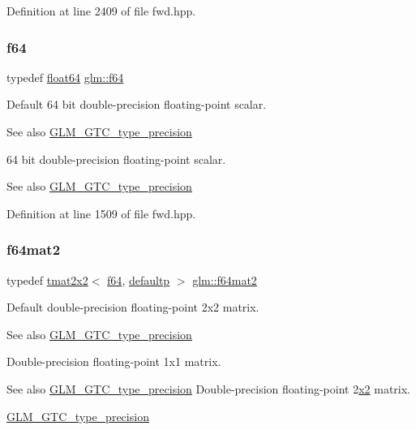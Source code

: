 Definition at line 2409 of file fwd.\+hpp.

\mbox{\label{group__gtc__type__precision_ga2bba392e555124b36cde6abba349bab3}} 
\subsubsection{\texorpdfstring{f64}{f64}}
{\footnotesize\ttfamily typedef \mbox{\hyperlink{group__gtc__type__precision_gab721f828b41f46b20cf4883b50733d3b}{float64}} \mbox{\hyperlink{group__gtc__type__precision_ga2bba392e555124b36cde6abba349bab3}{glm\+::f64}}}

Default 64 bit double-\/precision floating-\/point scalar. \begin{DoxySeeAlso}{See also}
\mbox{\hyperlink{group__gtc__type__precision}{G\+L\+M\+\_\+\+G\+T\+C\+\_\+type\+\_\+precision}}
\end{DoxySeeAlso}
64 bit double-\/precision floating-\/point scalar. \begin{DoxySeeAlso}{See also}
\mbox{\hyperlink{group__gtc__type__precision}{G\+L\+M\+\_\+\+G\+T\+C\+\_\+type\+\_\+precision}} 
\end{DoxySeeAlso}


Definition at line 1509 of file fwd.\+hpp.

\mbox{\label{group__gtc__type__precision_gaf66aa8b74ef627da80162c17a74a04fe}} 
\subsubsection{\texorpdfstring{f64mat2}{f64mat2}}
{\footnotesize\ttfamily typedef \mbox{\hyperlink{structglm_1_1tmat2x2}{tmat2x2}}$<$ \mbox{\hyperlink{group__gtc__type__precision_ga2bba392e555124b36cde6abba349bab3}{f64}}, \mbox{\hyperlink{namespaceglm_a0f04f086094c747d227af4425893f545a9d21ccd8b5a009ec7eb7677befc3bf51}{defaultp}} $>$ \mbox{\hyperlink{group__gtc__type__precision_gaf66aa8b74ef627da80162c17a74a04fe}{glm\+::f64mat2}}}

Default double-\/precision floating-\/point 2x2 matrix. \begin{DoxySeeAlso}{See also}
\mbox{\hyperlink{group__gtc__type__precision}{G\+L\+M\+\_\+\+G\+T\+C\+\_\+type\+\_\+precision}}
\end{DoxySeeAlso}
Double-\/precision floating-\/point 1x1 matrix. \begin{DoxySeeAlso}{See also}
\mbox{\hyperlink{group__gtc__type__precision}{G\+L\+M\+\_\+\+G\+T\+C\+\_\+type\+\_\+precision}} Double-\/precision floating-\/point 2\mbox{\hyperlink{glad_8h_ad2cea6eadb01f017f0d57e7edf0ce988}{x2}} matrix. 

\mbox{\hyperlink{group__gtc__type__precision}{G\+L\+M\+\_\+\+G\+T\+C\+\_\+type\+\_\+precision}} 
\end{DoxySeeAlso}


